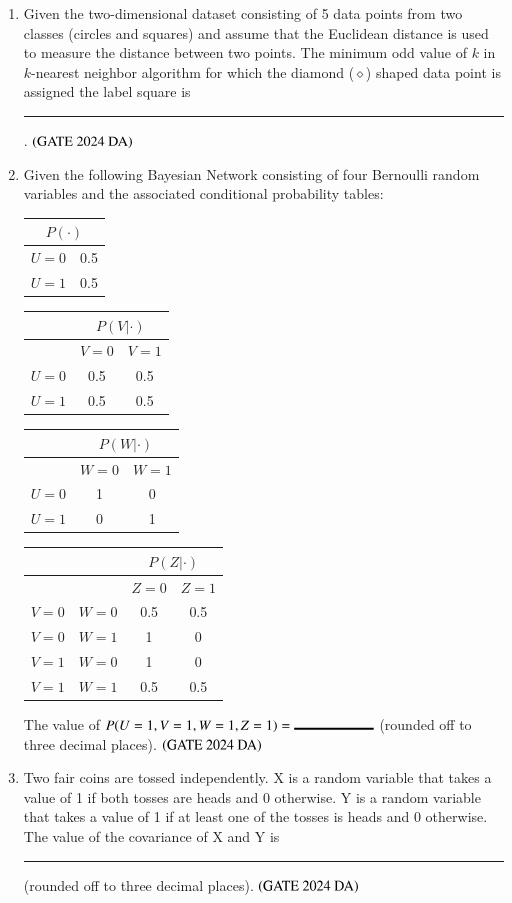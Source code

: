 \documentclass[journal,12pt,onecolumn]{IEEEtran}
\theoremstyle{remark}
\begin{document}
\begin{enumerate}[resume]
\item Given the two-dimensional dataset consisting of 5 data points from two classes (circles and squares) and assume that the Euclidean distance is used to measure the distance between two points. The minimum odd value of $k$ in $k$-nearest neighbor algorithm for which the diamond ($\diamond$) shaped data point is assigned the label square is  \rule{2cm}{0.5mm}.
\hfill $\left(\text{GATE 2024 DA}\right)$
\bigskip

\item Given the following Bayesian Network consisting of four Bernoulli random variables and the associated conditional probability tables:
\begin{center}
\begin{tabular}{|c|c|}
\hline
\multicolumn{2}{|c|}{$P(\cdot)$} \\
\hline
$U=0$ & 0.5 \\
$U=1$ & 0.5 \\
\hline
\end{tabular}
\quad
\begin{tabular}{|c|c|c|}
\hline
 & \multicolumn{2}{c|}{$P(V|\cdot)$} \\
\hline
 & $V=0$ & $V=1$ \\
\hline
$U=0$ & 0.5 & 0.5 \\
$U=1$ & 0.5 & 0.5 \\
\hline
\end{tabular}
\end{center}
\begin{center}
\begin{tabular}{|c|c|c|}
\hline
 & \multicolumn{2}{c|}{$P(W|\cdot)$} \\
\hline
 & $W=0$ & $W=1$ \\
\hline
$U=0$ & 1 & 0 \\
$U=1$ & 0 & 1 \\
\hline
\end{tabular}
\quad
\begin{tabular}{|c|c|c|c|}
\hline
 & & \multicolumn{2}{c|}{$P(Z|\cdot)$} \\
\hline
 & & $Z=0$ & $Z=1$ \\
\hline
$V=0$ & $W=0$ & 0.5 & 0.5 \\
$V=0$ & $W=1$ & 1 & 0 \\
$V=1$ & $W=0$ & 1 & 0 \\
$V=1$ & $W=1$ & 0.5 & 0.5 \\
\hline
\end{tabular}
\end{center}
The value of $P(U=1, V=1, W=1, Z=1) =  \rule{2cm}{0.5mm}$ (rounded off to three decimal places).
\hfill $\left(\text{GATE 2024 DA}\right)$
\bigskip

\item Two fair coins are tossed independently. X is a random variable that takes a value of 1 if both tosses are heads and 0 otherwise. Y is a random variable that takes a value of 1 if at least one of the tosses is heads and 0 otherwise. The value of the covariance of X and Y is  \rule{2cm}{0.5mm} (rounded off to three decimal places).
\hfill $\left(\text{GATE 2024 DA}\right)$

\end{enumerate}
\end{document}
